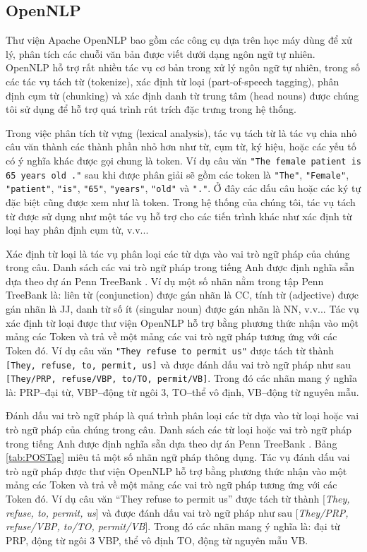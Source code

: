 \subsection*{OpenNLP}
Thư viện Apache OpenNLP bao gồm các công cụ dựa trên học máy dùng để xử lý, phân tích các chuỗi văn bản được viết dưới dạng ngôn ngữ tự nhiên. OpenNLP hỗ trợ rất nhiều tác vụ cơ bản trong xử lý ngôn ngữ tự nhiên, trong số các tác vụ tách từ (tokenize), xác định từ loại (part-of-speech tagging), phân định cụm từ (chunking) và xác định danh từ trung tâm (head nouns) được chúng tôi sử dụng để hỗ trợ quá trình rút trích đặc trưng trong hệ thống. 

Trong việc phân tích từ vựng (lexical analysis), tác vụ tách từ là tác vụ chia nhỏ câu văn thành các thành phần nhỏ hơn như từ, cụm từ, ký hiệu, hoặc các yếu tố có ý nghĩa khác được gọi chung là token. Ví dụ câu văn \texttt{"The female patient is 65 years old ."} sau khi được phân giải sẽ gồm các token là \texttt{"The"}, \texttt{"Female"}, \texttt{"patient"}, \texttt{"is"}, \texttt{"65"}, \texttt{"years"}, \texttt{"old"} và \texttt{"."}. Ở đây các dấu câu hoặc các ký tự đặc biệt cũng được xem như là token. Trong hệ thống của chúng tôi, tác vụ tách từ được sử dụng như một tác vụ hỗ trợ cho các tiến trình khác như xác định từ loại hay phân định cụm từ, v.v...

Xác định từ loại là tác vụ phân loại các từ dựa vào vai trò ngữ pháp của chúng trong câu. Danh sách các vai trò ngữ pháp trong tiếng Anh được định nghĩa sẵn dựa theo dự án Penn TreeBank \cite{Santorini1990}. Ví dụ một số nhãn nằm trong tập Penn TreeBank là: liên từ (conjunction) được gán nhãn là CC, tính từ (adjective) được gán nhãn là JJ, danh từ số ít (singular noun) được gán nhãn là NN, v.v... Tác vụ xác định từ loại được thư viện OpenNLP hỗ trợ bằng phương thức nhận vào một mảng các Token và trả về một mảng các vai trò ngữ pháp tương ứng với các Token đó. Ví dụ câu văn \texttt{"They refuse to permit us"} được tách từ thành \texttt{[They, refuse, to, permit, us]} và được đánh dấu vai trò ngữ pháp như sau \texttt{[They/PRP, refuse/VBP, to/TO, permit/VB]}. Trong đó các nhãn mang ý nghĩa là: PRP--đại từ, VBP--động từ ngôi 3, TO--thể vô định, VB--động từ nguyên mẫu.

Đánh dấu vai trò ngữ pháp là quá trình phân loại các từ dựa vào từ loại hoặc vai trò ngữ pháp của chúng trong câu. Danh sách các từ loại hoặc vai trò ngữ pháp trong tiếng Anh được định nghĩa sẵn dựa theo dự án Penn TreeBank \cite{Santorini1990}. Bảng \ref{tab:POSTag} miêu tả một số nhãn ngữ pháp thông dụng. Tác vụ đánh dấu vai trò ngữ pháp được thư viện OpenNLP hỗ trợ bằng phương thức nhận vào một mảng các Token và trả về một mảng các vai trò ngữ pháp tương ứng với các Token đó. Ví dụ câu văn ``They refuse to permit us'' được tách từ thành [\textit{They, refuse, to, permit, us}] và được đánh dấu vai trò ngữ pháp như sau [\textit{They/PRP, refuse/VBP, to/TO, permit/VB}]. Trong đó các nhãn mang ý nghĩa là: đại từ PRP, động từ ngôi 3 VBP, thể vô định TO, động từ nguyên mẫu VB.

